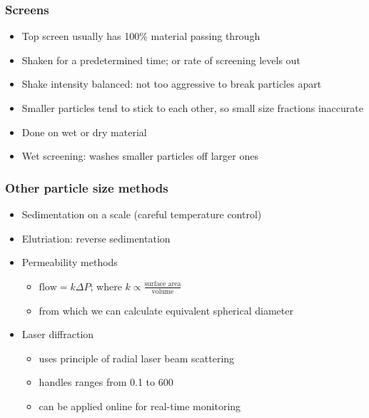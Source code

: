 \begin{frame}\frametitle{Screens}
	\begin{itemize}
		\item	Top screen usually has 100\% material passing through
		\item	Shaken for a predetermined time; or rate of screening levels out
		\item	Shake intensity balanced: not too aggressive to break particles apart
		\item	Smaller particles tend to stick to each other, so small size fractions inaccurate
		\item	Done on wet or dry material
		\item	Wet screening: washes smaller particles off larger ones
	\end{itemize}
\end{frame}

\begin{frame}\frametitle{Other particle size methods}
	\begin{itemize}		
		\item	Sedimentation on a scale {\tiny (careful temperature control)}
		\item	Elutriation: reverse sedimentation
		\item	Permeability methods
			\begin{itemize}
				\item	$\text{flow} = k \Delta P$; where $k \propto \displaystyle \frac{\text{surface area}}{\text{volume}}$ 
				\item	from which we can calculate equivalent spherical diameter
			\end{itemize}
		\item	Laser diffraction
			\begin{itemize}
				\item	uses principle of radial laser beam scattering
				\item	handles ranges from 0.1 to 600 \micron
				\item	can be applied online for real-time monitoring
			\end{itemize}
	\end{itemize}
\end{frame}


